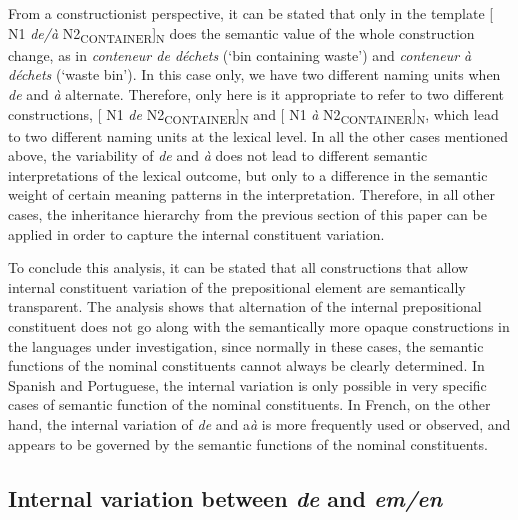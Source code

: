 \documentclass[output=paper]{langsci/langscibook}
\begin{document}
From a constructionist perspective, it can be stated that only in the template [ N1 \textit{de/à} N2\textsubscript{CONTAINER}]\textsubscript{N} does the semantic value of the whole construction change, as in \textit{conteneur de déchets} (`bin containing waste') and \textit{conteneur à déchets} (`waste bin'). In this case only, we have two different naming units when \textit{de} and \textit{à} alternate. Therefore, only here is it appropriate to refer to two different constructions, [ N1 \textit{de} N2\textsubscript{CONTAINER}]\textsubscript{N} and  [ N1 \textit{à} N2\textsubscript{CONTAINER}]\textsubscript{N}, which lead to two different naming units at the lexical level. In all the other cases mentioned above, the variability of \textit{de} and \textit{à} does not lead to different semantic interpretations of the lexical outcome, but only to a difference in the semantic weight of certain meaning patterns in the interpretation. Therefore, in all other cases, the inheritance hierarchy from the previous section of this paper can be applied in order to capture the internal constituent variation.

To conclude this analysis, it can be stated that all constructions that allow internal constituent variation of the prepositional element are semantically transparent.  The analysis shows that alternation of the internal prepositional constituent does not go along with the semantically more opaque constructions in the languages under investigation, since normally in these cases, the semantic functions of the nominal constituents cannot always be clearly determined. In Spanish and Portuguese, the internal variation is only possible in very specific cases of semantic function of the nominal constituents. In French, on the other hand, the internal variation of \textit{de} and a\textit{à} is more frequently used or observed, and appears to be governed by the semantic functions of the nominal constituents.

\subsection{Internal variation between \textit{de} and \textit{em/en}}
\end{document}
